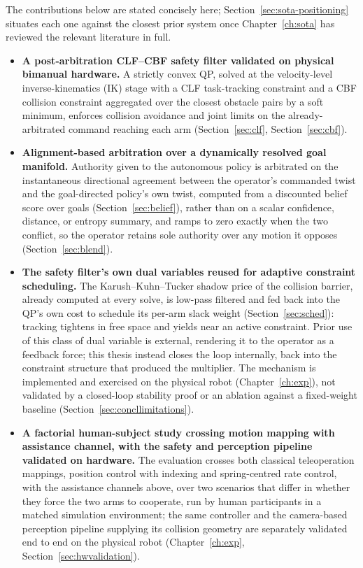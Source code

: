 \documentclass[12pt,a4paper,twoside,openright]{report}
\begin{document}
The contributions below are stated concisely here; Section~\ref{sec:sota-positioning} situates each one against the closest prior system once Chapter~\ref{ch:sota} has reviewed the relevant literature in full.

\begin{itemize}[nosep]
\item \textbf{A post-arbitration CLF--CBF safety filter validated on physical bimanual hardware.} A strictly convex QP, solved at the velocity-level inverse-kinematics (IK) stage with a CLF task-tracking constraint and a CBF collision constraint aggregated over the closest obstacle pairs by a soft minimum, enforces collision avoidance and joint limits on the already-arbitrated command reaching each arm (Section~\ref{sec:clf}, Section~\ref{sec:cbf}).
\item \textbf{Alignment-based arbitration over a dynamically resolved goal manifold.} Authority given to the autonomous policy is arbitrated on the instantaneous directional agreement between the operator's commanded twist and the goal-directed policy's own twist, computed from a discounted belief score over goals (Section~\ref{sec:belief}), rather than on a scalar confidence, distance, or entropy summary, and ramps to zero exactly when the two conflict, so the operator retains sole authority over any motion it opposes (Section~\ref{sec:blend}).
\item \textbf{The safety filter's own dual variables reused for adaptive constraint scheduling.} The Karush--Kuhn--Tucker shadow price of the collision barrier, already computed at every solve, is low-pass filtered and fed back into the QP's own cost to schedule its per-arm slack weight (Section~\ref{sec:sched}): tracking tightens in free space and yields near an active constraint. Prior use of this class of dual variable is external, rendering it to the operator as a feedback force; this thesis instead closes the loop internally, back into the constraint structure that produced the multiplier. The mechanism is implemented and exercised on the physical robot (Chapter~\ref{ch:exp}), not validated by a closed-loop stability proof or an ablation against a fixed-weight baseline (Section~\ref{sec:concllimitations}).
\item \textbf{A factorial human-subject study crossing motion mapping with assistance channel, with the safety and perception pipeline validated on hardware.} The evaluation crosses both classical teleoperation mappings, position control with indexing and spring-centred rate control, with the assistance channels above, over two scenarios that differ in whether they force the two arms to cooperate, run by human participants in a matched simulation environment; the same controller and the camera-based perception pipeline supplying its collision geometry are separately validated end to end on the physical robot (Chapter~\ref{ch:exp}, Section~\ref{sec:hwvalidation}).

\end{itemize}
\end{document}
